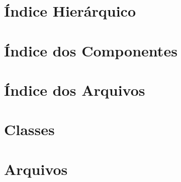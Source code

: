 \documentclass[twoside]{book}
\newcommand{\+}{\discretionary{\mbox{\scriptsize$\hookleftarrow$}}{}{}}
\newcommand{\clearemptydoublepage}{%
    \newpage{\pagestyle{empty}\cleardoublepage}%
  }
\begin{document}
\chapter{Índice Hierárquico}

\chapter{Índice dos Componentes}

\chapter{Índice dos Arquivos}

\chapter{Classes}










\chapter{Arquivos}
































  \backmatter
  \newpage
  \clearemptydoublepage
  \printindex
\end{document}
